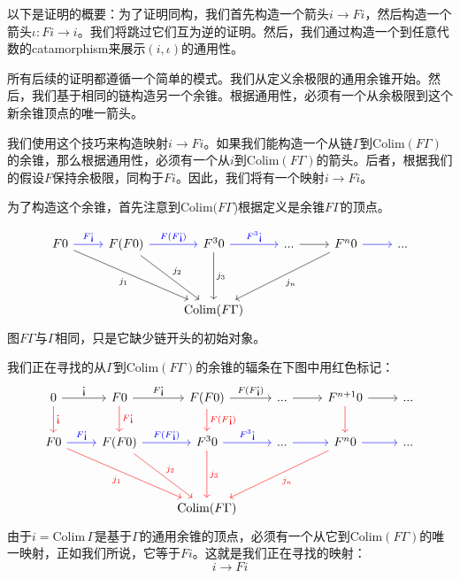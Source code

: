 \documentclass[DaoFP]{subfiles}
\begin{document}
以下是证明的概要：为了证明同构，我们首先构造一个箭头$i \to F i$，然后构造一个箭头$\iota \colon F i \to i$。我们将跳过它们互为逆的证明。然后，我们通过构造一个到任意代数的catamorphism来展示$(i, \iota)$的通用性。

所有后续的证明都遵循一个简单的模式。我们从定义余极限的通用余锥开始。然后，我们基于相同的链构造另一个余锥。根据通用性，必须有一个从余极限到这个新余锥顶点的唯一箭头。

我们使用这个技巧来构造映射$i \to F i$。如果我们能构造一个从链$\Gamma$到$\text{Colim} (F \Gamma)$的余锥，那么根据通用性，必须有一个从$i$到$\text{Colim} (F \Gamma)$的箭头。后者，根据我们的假设$F$保持余极限，同构于$F i$。因此，我们将有一个映射$i \to F i$。

为了构造这个余锥，首先注意到$\text{Colim} (F \Gamma$)根据定义是余锥$F \Gamma$的顶点。

\[
 \begin{tikzcd}
 F 0
 \arrow[r, blue, "F \mbox{!`}"]
 \arrow[ddrr, "j_1"']
 &  F (F 0)
  \arrow[r, blue, "F(F  \mbox{!`})"]
 \arrow[ddr, "j_2"]
& F^3 0
  \arrow[r, blue, "F^3\mbox{!`}"]
  \arrow[dd, "j_3"]
 & ...
 \arrow[r]
 & F^n 0
  \arrow[r, blue]
 \arrow[ddll, "j_n"]
 & ...
 \\
 \\
 &&\text{Colim} (F \Gamma)
  \end{tikzcd}
\]
图$F \Gamma$与$\Gamma$相同，只是它缺少链开头的初始对象。

我们正在寻找的从$\Gamma$到$\text{Colim} (F \Gamma)$的余锥的辐条在下图中用红色标记：
\[
 \begin{tikzcd}
 0
 \arrow[r, "\mbox{!`}"]
 \arrow[d, red, "\mbox{!`}"]
 & F 0
  \arrow[r, "F\mbox{!`}"]
  \arrow[d, red, "F\mbox{!`}"]
& F (F 0)
  \arrow[r, "F(F\mbox{!`})"]
  \arrow[d, red, "F(F\mbox{!`})"]
 & ...
 \arrow[r]
 & F^{n+1} 0
  \arrow[r]
  \arrow[d, red]
 & ...
 \\
 F 0
 \arrow[r, blue, "F \mbox{!`}"]
 \arrow[ddrr, red, "j_1"']
 &  F (F 0)
  \arrow[r, blue, "F(F  \mbox{!`})"]
 \arrow[ddr, red, "j_2"]
& F^3 0
  \arrow[r, blue, "F^3\mbox{!`}"]
  \arrow[dd, red, "j_3"]
 & ...
 \arrow[r, blue]
 & F^n 0
  \arrow[r, blue]
 \arrow[ddll, red, "j_n"]
 & ...
 \\
 \\
 &&\text{Colim} (F \Gamma)
  \end{tikzcd}
\]
由于$i = \text{Colim}\, \Gamma$是基于$\Gamma$的通用余锥的顶点，必须有一个从它到$\text{Colim} (F \Gamma)$的唯一映射，正如我们所说，它等于$F i$。这就是我们正在寻找的映射：
\[ i \to F i \]
\end{document}
